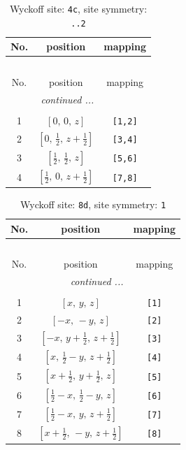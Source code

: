 \documentclass[fleqn,8pt]{jsarticle}
\begin{document}
\renewcommand{\arraystretch}{1.2}
\begin{longtable}{ccc}
\caption{Wyckoff site: {\tt 4c}, site symmetry: {\tt ..2}}
 \\
 \hline \hline
No. & position & mapping \\ \hline \endfirsthead

\multicolumn{2}{l}{\tablename\ \thetable{}} \\
 \hline \hline
No. & position & mapping \\ \hline \endhead

 \hline \hline
\multicolumn{2}{r}{\footnotesize\it continued ...} \\ \endfoot

 \hline \hline
\multicolumn{2}{r}{} \\ \endlastfoot

1 & $\left[ 0,\, 0,\, z \right]$ & {\tt [1,2]} \\ \hline
2 & $\left[ 0,\, \frac{1}{2},\, z + \frac{1}{2} \right]$ & {\tt [3,4]} \\ \hline
3 & $\left[ \frac{1}{2},\, \frac{1}{2},\, z \right]$ & {\tt [5,6]} \\ \hline
4 & $\left[ \frac{1}{2},\, 0,\, z + \frac{1}{2} \right]$ & {\tt [7,8]} \\
\end{longtable}
\renewcommand{\arraystretch}{1.2}
\begin{longtable}{ccc}
\caption{Wyckoff site: {\tt 8d}, site symmetry: {\tt 1}}
 \\
 \hline \hline
No. & position & mapping \\ \hline \endfirsthead

\multicolumn{2}{l}{\tablename\ \thetable{}} \\
 \hline \hline
No. & position & mapping \\ \hline \endhead

 \hline \hline
\multicolumn{2}{r}{\footnotesize\it continued ...} \\ \endfoot

 \hline \hline
\multicolumn{2}{r}{} \\ \endlastfoot

1 & $\left[ x,\, y,\, z \right]$ & {\tt [1]} \\ \hline
2 & $\left[ - x,\, - y,\, z \right]$ & {\tt [2]} \\ \hline
3 & $\left[ - x,\, y + \frac{1}{2},\, z + \frac{1}{2} \right]$ & {\tt [3]} \\ \hline
4 & $\left[ x,\, \frac{1}{2} - y,\, z + \frac{1}{2} \right]$ & {\tt [4]} \\ \hline
5 & $\left[ x + \frac{1}{2},\, y + \frac{1}{2},\, z \right]$ & {\tt [5]} \\ \hline
6 & $\left[ \frac{1}{2} - x,\, \frac{1}{2} - y,\, z \right]$ & {\tt [6]} \\ \hline
7 & $\left[ \frac{1}{2} - x,\, y,\, z + \frac{1}{2} \right]$ & {\tt [7]} \\ \hline
8 & $\left[ x + \frac{1}{2},\, - y,\, z + \frac{1}{2} \right]$ & {\tt [8]} \\
\end{longtable}
\end{document}
